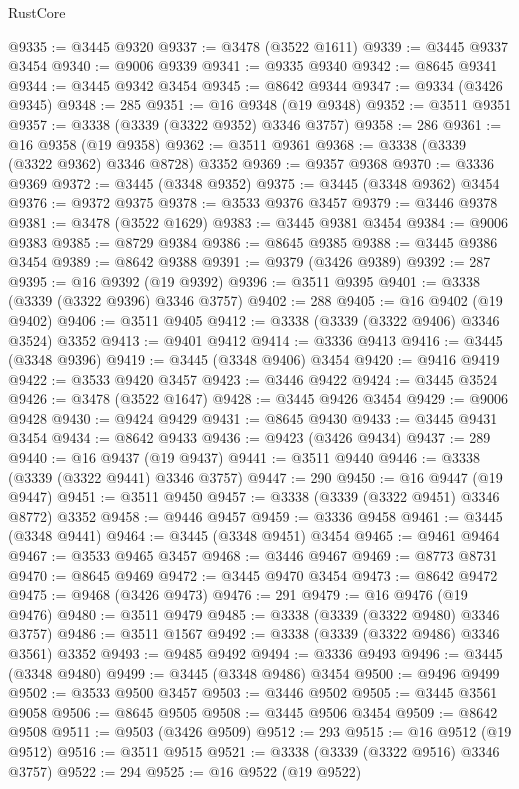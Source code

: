 \begin{lexlean}{RustCore}
\begin{coremodule}
@9335 := @3445 @9320
@9337 := @3478 (@3522 @1611)
@9339 := @3445 @9337 @3454
@9340 := @9006 @9339
@9341 := @9335 @9340
@9342 := @8645 @9341
@9344 := @3445 @9342 @3454
@9345 := @8642 @9344
@9347 := @9334 (@3426 @9345)
@9348 := 285
@9351 := @16 @9348 (@19 @9348)
@9352 := @3511 @9351
@9357 := @3338 (@3339 (@3322 @9352) @3346 @3757)
@9358 := 286
@9361 := @16 @9358 (@19 @9358)
@9362 := @3511 @9361
@9368 := @3338 (@3339 (@3322 @9362) @3346 @8728) @3352
@9369 := @9357 @9368
@9370 := @3336 @9369
@9372 := @3445 (@3348 @9352)
@9375 := @3445 (@3348 @9362) @3454
@9376 := @9372 @9375
@9378 := @3533 @9376 @3457
@9379 := @3446 @9378
@9381 := @3478 (@3522 @1629)
@9383 := @3445 @9381 @3454
@9384 := @9006 @9383
@9385 := @8729 @9384
@9386 := @8645 @9385
@9388 := @3445 @9386 @3454
@9389 := @8642 @9388
@9391 := @9379 (@3426 @9389)
@9392 := 287
@9395 := @16 @9392 (@19 @9392)
@9396 := @3511 @9395
@9401 := @3338 (@3339 (@3322 @9396) @3346 @3757)
@9402 := 288
@9405 := @16 @9402 (@19 @9402)
@9406 := @3511 @9405
@9412 := @3338 (@3339 (@3322 @9406) @3346 @3524) @3352
@9413 := @9401 @9412
@9414 := @3336 @9413
@9416 := @3445 (@3348 @9396)
@9419 := @3445 (@3348 @9406) @3454
@9420 := @9416 @9419
@9422 := @3533 @9420 @3457
@9423 := @3446 @9422
@9424 := @3445 @3524
@9426 := @3478 (@3522 @1647)
@9428 := @3445 @9426 @3454
@9429 := @9006 @9428
@9430 := @9424 @9429
@9431 := @8645 @9430
@9433 := @3445 @9431 @3454
@9434 := @8642 @9433
@9436 := @9423 (@3426 @9434)
@9437 := 289
@9440 := @16 @9437 (@19 @9437)
@9441 := @3511 @9440
@9446 := @3338 (@3339 (@3322 @9441) @3346 @3757)
@9447 := 290
@9450 := @16 @9447 (@19 @9447)
@9451 := @3511 @9450
@9457 := @3338 (@3339 (@3322 @9451) @3346 @8772) @3352
@9458 := @9446 @9457
@9459 := @3336 @9458
@9461 := @3445 (@3348 @9441)
@9464 := @3445 (@3348 @9451) @3454
@9465 := @9461 @9464
@9467 := @3533 @9465 @3457
@9468 := @3446 @9467
@9469 := @8773 @8731
@9470 := @8645 @9469
@9472 := @3445 @9470 @3454
@9473 := @8642 @9472
@9475 := @9468 (@3426 @9473)
@9476 := 291
@9479 := @16 @9476 (@19 @9476)
@9480 := @3511 @9479
@9485 := @3338 (@3339 (@3322 @9480) @3346 @3757)
@9486 := @3511 @1567
@9492 := @3338 (@3339 (@3322 @9486) @3346 @3561) @3352
@9493 := @9485 @9492
@9494 := @3336 @9493
@9496 := @3445 (@3348 @9480)
@9499 := @3445 (@3348 @9486) @3454
@9500 := @9496 @9499
@9502 := @3533 @9500 @3457
@9503 := @3446 @9502
@9505 := @3445 @3561 @9058
@9506 := @8645 @9505
@9508 := @3445 @9506 @3454
@9509 := @8642 @9508
@9511 := @9503 (@3426 @9509)
@9512 := 293
@9515 := @16 @9512 (@19 @9512)
@9516 := @3511 @9515
@9521 := @3338 (@3339 (@3322 @9516) @3346 @3757)
@9522 := 294
@9525 := @16 @9522 (@19 @9522)

\end{coremodule}
\end{lexlean}
